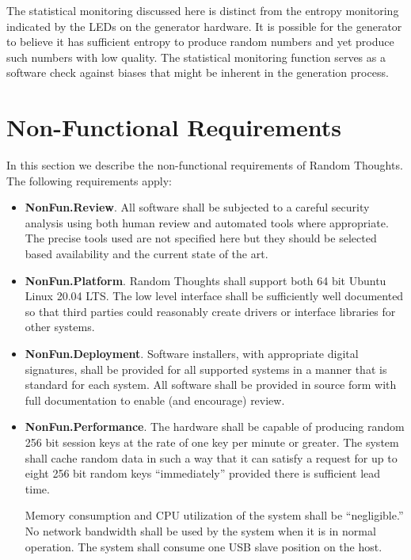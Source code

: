 The statistical monitoring discussed here is distinct from the entropy monitoring indicated by
the LEDs on the generator hardware. It is possible for the generator to believe it has
sufficient entropy to produce random numbers and yet produce such numbers with low quality. The
statistical monitoring function serves as a software check against biases that might be inherent
in the generation process.

\section{Non-Functional Requirements}
\label{sec:non-functional}

In this section we describe the non-functional requirements of Random Thoughts. The following
requirements apply:

\begin{itemize}

\item \textbf{NonFun.Review}. All software shall be subjected to a careful security analysis
  using both human review and automated tools where appropriate. The precise tools used are not
  specified here but they should be selected based availability and the current state of the
  art.

\item \textbf{NonFun.Platform}. Random Thoughts shall support both 64 bit Ubuntu Linux 20.04
  LTS. The low level interface shall be sufficiently well documented so that third parties could
  reasonably create drivers or interface libraries for other systems.

\item \textbf{NonFun.Deployment}. Software installers, with appropriate digital signatures,
  shall be provided for all supported systems in a manner that is standard for each system.
  All software shall be provided in source form with full documentation to enable (and
  encourage) review.

\item \textbf{NonFun.Performance}. The hardware shall be capable of producing random 256 bit
  session keys at the rate of one key per minute or greater. The system shall cache random data
  in such a way that it can satisfy a request for up to eight 256 bit random keys
  ``immediately'' provided there is sufficient lead time.

  Memory consumption and CPU utilization of the system shall be ``negligible.'' No network
  bandwidth shall be used by the system when it is in normal operation. The system shall consume
  one USB slave position on the host.


\end{itemize}
